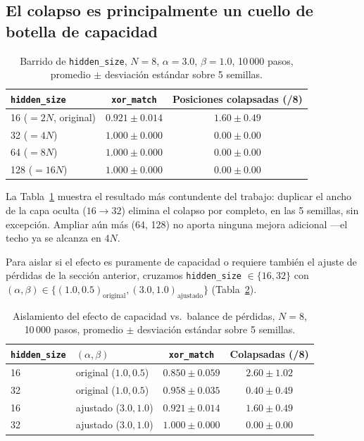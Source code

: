\documentclass[manuscript,screen]{acmart}
\begin{document}
\subsection{El colapso es principalmente un cuello de botella de capacidad}

\begin{table}[h]
  \caption{Barrido de \texttt{hidden\_size}, $N=8$, $\alpha=3.0$, $\beta=1.0$, 10\,000 pasos,
    promedio $\pm$ desviación estándar sobre 5 semillas.}
  \label{tab:capacity}
  \begin{tabular}{lcc}
    \toprule
    \texttt{hidden\_size} & \texttt{xor\_match} & Posiciones colapsadas (/8) \\
    \midrule
    16 ($=2N$, original) & $0.921 \pm 0.014$ & $1.60 \pm 0.49$ \\
    32 ($=4N$)            & $1.000 \pm 0.000$ & $0.00 \pm 0.00$ \\
    64 ($=8N$)            & $1.000 \pm 0.000$ & $0.00 \pm 0.00$ \\
    128 ($=16N$)          & $1.000 \pm 0.000$ & $0.00 \pm 0.00$ \\
    \bottomrule
  \end{tabular}
\end{table}

La Tabla~\ref{tab:capacity} muestra el resultado más contundente del trabajo: duplicar el ancho
de la capa oculta ($16 \to 32$) elimina el colapso por completo, en las 5 semillas, sin
excepción. Ampliar aún más (64, 128) no aporta ninguna mejora adicional —el techo ya se alcanza
en $4N$.

Para aislar si el efecto es puramente de capacidad o requiere también el ajuste de pérdidas de
la sección anterior, cruzamos \texttt{hidden\_size} $\in \{16, 32\}$ con
$(\alpha,\beta) \in \{(1.0,0.5)_{\text{original}}, (3.0,1.0)_{\text{ajustado}}\}$
(Tabla~\ref{tab:isolation}).

\begin{table}[h]
  \caption{Aislamiento del efecto de capacidad vs.\ balance de pérdidas, $N=8$, 10\,000
    pasos, promedio $\pm$ desviación estándar sobre 5 semillas.}
  \label{tab:isolation}
  \begin{tabular}{llcc}
    \toprule
    \texttt{hidden\_size} & $(\alpha,\beta)$ & \texttt{xor\_match} & Colapsadas (/8) \\
    \midrule
    16 & original ($1.0,0.5$) & $0.850 \pm 0.059$ & $2.60 \pm 1.02$ \\
    32 & original ($1.0,0.5$) & $0.958 \pm 0.035$ & $0.40 \pm 0.49$ \\
    16 & ajustado ($3.0,1.0$) & $0.921 \pm 0.014$ & $1.60 \pm 0.49$ \\
    32 & ajustado ($3.0,1.0$) & $1.000 \pm 0.000$ & $0.00 \pm 0.00$ \\
    \bottomrule
  \end{tabular}
\end{table}
\end{document}
